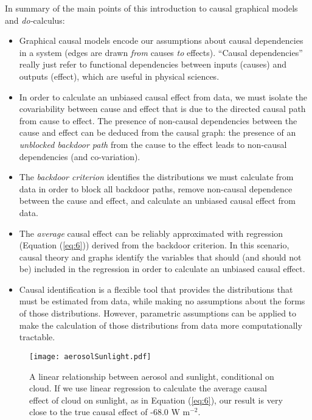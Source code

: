 \documentclass[12pt]{article}
\begin{document}
In summary of the main points of this introduction to causal graphical
models and \textit{do-}calculus:

\begin{itemize}
\item Graphical causal models encode our assumptions about causal
  dependencies in a system (edges are drawn \emph{from} causes \emph{to}
  effects). ``Causal dependencies'' really just refer to functional
  dependencies between inputs (causes) and outputs (effect), which are
  useful in physical sciences.
\item In order to calculate an unbiased causal effect from data, we
  must isolate the covariability between cause and effect that is due
  to the directed causal path from cause to effect. The presence of
  non-causal dependencies between the cause and effect can be deduced
  from the causal graph: the presence of an \textit{unblocked backdoor
    path} from the cause to the effect leads to non-causal
  dependencies (and co-variation).
\item The \emph{backdoor criterion} identifies the distributions we
  must calculate from data in order to block all backdoor paths,
  remove non-causal dependence between the cause and effect, and
  calculate an unbiased causal effect from data.
\item The \emph{average} causal effect can be reliably approximated
  with regression (Equation (\ref{eq:6})) derived from the backdoor
  criterion. In this scenario, causal theory and graphs identify the
  variables that should (and should not be) included in the regression
  in order to calculate an unbiased causal effect.
\item Causal identification is a flexible tool that provides the
  distributions that must be estimated from data, while making no
  assumptions about the forms of those distributions. However,
  parametric assumptions can be applied to make the calculation of those
  distributions from data more computationally tractable.
\end{itemize}

\begin{figure} \texttt{[image: aerosolSunlight.pdf]}
  \caption{A linear relationship between aerosol and sunlight,
    conditional on cloud. If we use linear regression to calculate the
    average causal effect of cloud on sunlight, as in Equation
    (\ref{eq:6}), our result is very close to the true causal effect of
    -68.0 W m$^{-2}$.}
  \label{fig:linear}
\end{figure}
\end{document}
